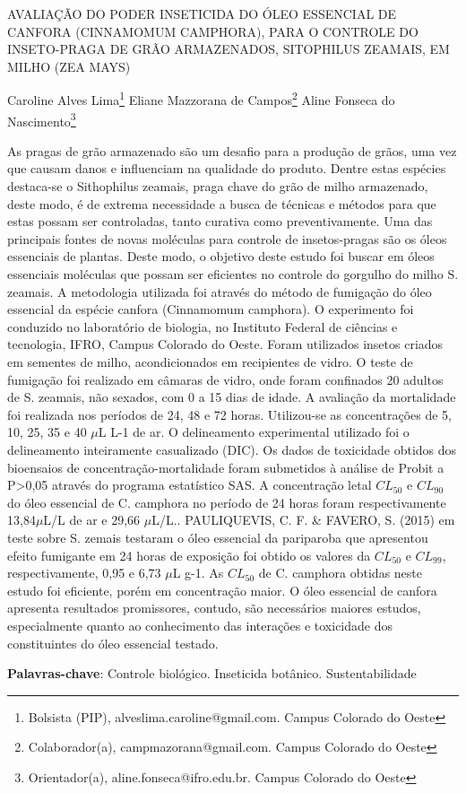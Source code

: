 \documentclass[article,12pt,onesidea,4paper,english,brazil]{abntex2}
\begin{document}
	
	
	\frenchspacing 
	
	\begin{center}
		\LARGE AVALIAÇÃO DO PODER INSETICIDA DO ÓLEO ESSENCIAL DE CANFORA \MakeUppercase{(Cinnamomum camphora)}, PARA O CONTROLE DO INSETO-PRAGA DE GRÃO ARMAZENADOS, \MakeUppercase{Sitophilus zeamais}, EM MILHO \MakeUppercase{(Zea mays)}
		
		\normalsize
		Caroline Alves Lima\footnote{Bolsista (PIP), alveslima.caroline@gmail.com. Campus Colorado do Oeste} 
		Eliane Mazzorana de Campos\footnote{Colaborador(a), campmazorana@gmail.com. Campus Colorado do Oeste} 
		Aline Fonseca do Nascimento\footnote{Orientador(a), aline.fonseca@ifro.edu.br. Campus Colorado do Oeste} 
		
	\end{center}
	 
	\noindent 
	As pragas de grão armazenado são um desafio para a produção de grãos, uma vez que causam danos e influenciam na qualidade do produto. Dentre estas espécies destaca-se o Sithophilus zeamais, praga chave do grão de milho armazenado, deste modo, é de extrema necessidade a busca de técnicas e métodos para que estas possam ser controladas, tanto curativa como preventivamente. Uma das principais fontes de novas moléculas para controle de insetos-pragas são os óleos essenciais de plantas. Deste modo, o objetivo deste estudo foi buscar em óleos essenciais moléculas que possam ser eficientes no controle do gorgulho do milho S. zeamais. A metodologia utilizada foi através do método de fumigação do óleo essencial da espécie canfora (Cinnamomum camphora). O experimento foi conduzido no laboratório de biologia, no Instituto Federal de ciências e tecnologia, IFRO, Campus Colorado do Oeste. Foram utilizados insetos criados em sementes de milho, acondicionados em recipientes de vidro. O teste de fumigação foi realizado em câmaras de vidro, onde foram confinados 20 adultos de S. zeamais, não sexados, com 0 a 15 dias de idade. A avaliação da mortalidade foi realizada nos períodos de 24, 48 e 72 horas. Utilizou-se as concentrações de 5, 10, 25, 35 e 40 $\mu$L L-1 de ar. O delineamento experimental utilizado foi o delineamento inteiramente casualizado (DIC). Os dados de toxicidade obtidos dos bioensaios de concentração-mortalidade foram submetidos à análise de Probit a P>0,05 através do programa estatístico SAS. A concentração letal $CL_{50}$ e $CL_{90}$ do óleo essencial de C. camphora no período de 24 horas foram respectivamente 13,84$\mu$L/L de ar e 29,66 $\mu$L/L.. PAULIQUEVIS, C. F. \& FAVERO, S. (2015) em teste sobre S. zemais testaram o óleo essencial da pariparoba que apresentou efeito fumigante em 24 horas de exposição foi obtido os valores da $CL_{50}$ e $CL_{99}$, respectivamente, 0,95 e 6,73 $\mu$L g-1. As $CL_{50}$ de C. camphora obtidas neste estudo foi eficiente, porém em concentração maior. O óleo essencial de canfora apresenta resultados promissores, contudo, são necessários maiores estudos, especialmente quanto ao conhecimento das interações e toxicidade dos constituintes do óleo essencial testado.
	\vspace{\onelineskip}
	
	\noindent
	\textbf{Palavras-chave}: Controle biológico. Inseticida botânico. Sustentabilidade
	
\end{document}

